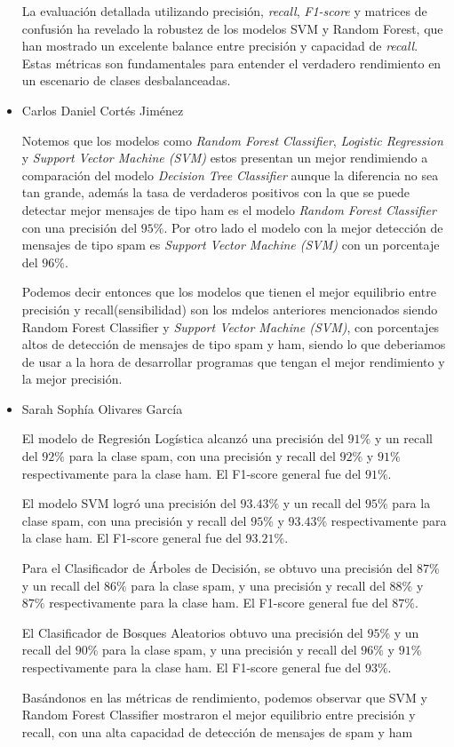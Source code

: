 \begin{itemize}
    La evaluación detallada utilizando precisión, \textit{recall}, \textit{F1-score} y matrices de confusión ha revelado la robustez de los modelos SVM y 
    Random Forest, que han mostrado un excelente balance entre precisión y capacidad de \textit{recall}. Estas métricas son fundamentales para 
    entender el verdadero rendimiento en un escenario de clases desbalanceadas.

    \item Carlos Daniel Cortés Jiménez

    Notemos que los modelos como \textit{Random Forest Classifier}, \textit{Logistic Regression} y \textit{Support Vector Machine (SVM)} estos 
    presentan un mejor rendimiendo a comparación del modelo \textit{Decision Tree Classifier} aunque la diferencia no sea tan grande, además 
    la tasa de verdaderos positivos con la que se puede detectar mejor mensajes de tipo ham es el modelo \textit{Random Forest Classifier} con 
    una precisión del $95\%$. Por otro lado el modelo con la mejor detección de mensajes de tipo spam es \textit{Support Vector Machine (SVM)} 
    con un porcentaje del $96\%$.

    Podemos decir entonces que los modelos que tienen el mejor equilibrio entre precisión y recall(sensibilidad) son los mdelos anteriores 
    mencionados siendo Random Forest Classifier y \textit{Support Vector Machine (SVM)}, con porcentajes altos de detección de mensajes 
    de tipo spam y ham, siendo lo que deberiamos de usar a la hora de desarrollar programas que tengan el mejor rendimiento y la mejor precisión.

    \item Sarah Sophía Olivares García

    El modelo de Regresión Logística alcanzó una precisión del $91\%$ y un recall del $92\%$ para la clase spam, con una precisión y         recall del $92\%$ y $91\%$ respectivamente para la clase ham. El F1-score general fue del $91\%$.

    El modelo SVM logró una precisión del $93.43\%$ y un recall del $95\%$ para la clase spam, con una precisión y recall del $95\%$ y         $93.43\%$ respectivamente para la clase ham. El F1-score general fue del $93.21\%$.

    Para el Clasificador de Árboles de Decisión, se obtuvo una precisión del $87\%$ y un recall del $86\%$ para la clase spam, y una         precisión y recall del $88\%$ y $87\%$ respectivamente para la clase ham. El F1-score general fue del $87\%$.

    El Clasificador de Bosques Aleatorios obtuvo una precisión del $95\%$ y un recall del $90\%$ para la clase spam, y una precisión y         recall del $96\%$ y $91\%$ respectivamente para la clase ham. El F1-score general fue del $93\%$.

    Basándonos en las métricas de rendimiento, podemos observar que SVM y Random Forest Classifier mostraron el mejor equilibrio entre         precisión y recall, con una alta capacidad de detección de mensajes de spam y ham

\end{itemize}
